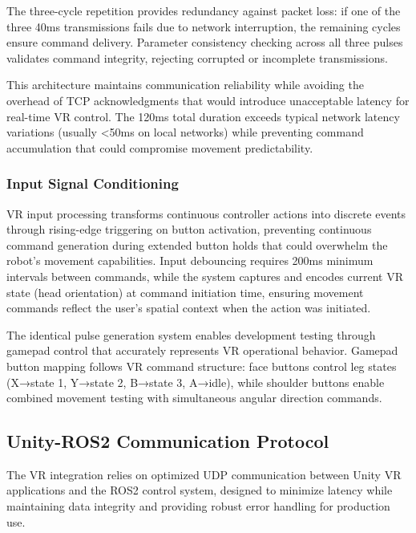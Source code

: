 The three-cycle repetition provides redundancy against packet loss: if one of the three 40ms transmissions fails due to network interruption, the remaining cycles ensure command delivery. Parameter consistency checking across all three pulses validates command integrity, rejecting corrupted or incomplete transmissions.

This architecture maintains communication reliability while avoiding the overhead of TCP acknowledgments that would introduce unacceptable latency for real-time VR control. The 120ms total duration exceeds typical network latency variations (usually <50ms on local networks) while preventing command accumulation that could compromise movement predictability.

\subsubsection{Input Signal Conditioning}
VR input processing transforms continuous controller actions into discrete events through rising-edge triggering on button activation, preventing continuous command generation during extended button holds that could overwhelm the robot's movement capabilities. Input debouncing requires 200ms minimum intervals between commands, while the system captures and encodes current VR state (head orientation) at command initiation time, ensuring movement commands reflect the user's spatial context when the action was initiated.

The identical pulse generation system enables development testing through gamepad control that accurately represents VR operational behavior. Gamepad button mapping follows VR command structure: face buttons control leg states (X→state 1, Y→state 2, B→state 3, A→idle), while shoulder buttons enable combined movement testing with simultaneous angular direction commands.

\subsection{Unity-ROS2 Communication Protocol}

The VR integration relies on optimized UDP communication between Unity VR applications and the ROS2 control system, designed to minimize latency while maintaining data integrity and providing robust error handling for production use.


